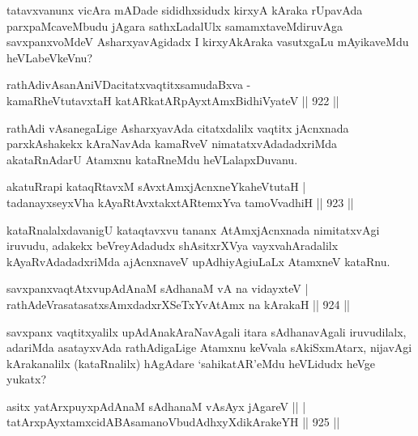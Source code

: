 \begin{artha}
tatavxvanunx vicAra mADade sididhxsidudx kirxyA kAraka rUpavAda parxpaMcaveMbudu jAgara sathxLadalUlx samamxtaveMdiruvAga savxpanxvoMdeV AsharxyavAgidadx I kirxyAkAraka vasutxgaLu mAyikaveMdu heVLabeVkeVnu?
\end{artha}

\begin{shl}
rathAdivAsanAniVDacitatxvaqtitxsamudaBxva -\\
kamaRheVtutavxtaH katAR\s katAR\s pAyxtAmx\s BidhiVyateV \hfill||  922 ||  
\end{shl}

\begin{artha}
rathAdi vAsanegaLige AsharxyavAda citatxdalilx vaqtitx jAcnxnada parxkAshakekx kAraNavAda kamaRveV nimatatxvAdadadxriMda akataRnAdarU Atamxnu kataRneMdu heVLalapxDuvanu.
\end{artha}

\begin{shl}
akatuRrapi kataqRtavxM sAvxtAmxjAcnxneYkaheVtutaH | \\
tadanayxseyxVha kAyaRtAvxtakxtAR\s \s temxYva tamoVvadhiH \hfill||  923 ||  
\end{shl}

\begin{artha}
kataRnalalxdavanigU kataqtavxvu tananx AtAmxjAcnxnada nimitatxvAgi iruvudu, adakekx beVreyAdadudx shAsitxrXVya vayxvahAradalilx kAyaRvAdadadxriMda ajAcnxnaveV upAdhiyAgiuLaLx AtamxneV kataRnu.
\end{artha}

\begin{shl}
savxpanxvaqtAtxvupAdAnaM sAdhanaM vA na vidayxteV | \\
rathAdeVrasatasatxsAmxdadxrXSeTxYvA\s \s tAmx na kArakaH \hfill||  924 ||  
\end{shl}

\begin{artha}
savxpanx vaqtitxyalilx upAdAnakAraNavAgali itara sAdhanavAgali iruvudilalx, adariMda asatayxvAda rathAdigaLige Atamxnu keVvala sAkiSxmAtarx, nijavAgi kArakanalilx (kataRnalilx) hAgAdare `sahikatAR'eMdu heVLidudx heVge yukatx?
\end{artha}

\begin{shl}
asitx yatArxpuyxpAdAnaM sAdhanaM vA\s sAyx jAgareV ||  | \\
tatArxpAyxtamxcidABAsamanoVbudAdhxyXdikArakeYH \hfill||  925 ||  
\end{shl}
				
